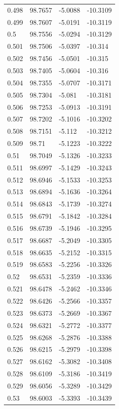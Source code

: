 \begin{tabular}{llll}
0.498 & 98.7657 & -5.0088 & -10.3109 \\
0.499 & 98.7607 & -5.0191 & -10.3119 \\
0.5 & 98.7556 & -5.0294 & -10.3129 \\
0.501 & 98.7506 & -5.0397 & -10.314 \\
0.502 & 98.7456 & -5.0501 & -10.315 \\
0.503 & 98.7405 & -5.0604 & -10.316 \\
0.504 & 98.7355 & -5.0707 & -10.3171 \\
0.505 & 98.7304 & -5.081 & -10.3181 \\
0.506 & 98.7253 & -5.0913 & -10.3191 \\
0.507 & 98.7202 & -5.1016 & -10.3202 \\
0.508 & 98.7151 & -5.112 & -10.3212 \\
0.509 & 98.71 & -5.1223 & -10.3222 \\
0.51 & 98.7049 & -5.1326 & -10.3233 \\
0.511 & 98.6997 & -5.1429 & -10.3243 \\
0.512 & 98.6946 & -5.1533 & -10.3253 \\
0.513 & 98.6894 & -5.1636 & -10.3264 \\
0.514 & 98.6843 & -5.1739 & -10.3274 \\
0.515 & 98.6791 & -5.1842 & -10.3284 \\
0.516 & 98.6739 & -5.1946 & -10.3295 \\
0.517 & 98.6687 & -5.2049 & -10.3305 \\
0.518 & 98.6635 & -5.2152 & -10.3315 \\
0.519 & 98.6583 & -5.2256 & -10.3326 \\
0.52 & 98.6531 & -5.2359 & -10.3336 \\
0.521 & 98.6478 & -5.2462 & -10.3346 \\
0.522 & 98.6426 & -5.2566 & -10.3357 \\
0.523 & 98.6373 & -5.2669 & -10.3367 \\
0.524 & 98.6321 & -5.2772 & -10.3377 \\
0.525 & 98.6268 & -5.2876 & -10.3388 \\
0.526 & 98.6215 & -5.2979 & -10.3398 \\
0.527 & 98.6162 & -5.3082 & -10.3408 \\
0.528 & 98.6109 & -5.3186 & -10.3419 \\
0.529 & 98.6056 & -5.3289 & -10.3429 \\
0.53 & 98.6003 & -5.3393 & -10.3439 \\

\end{tabular}
